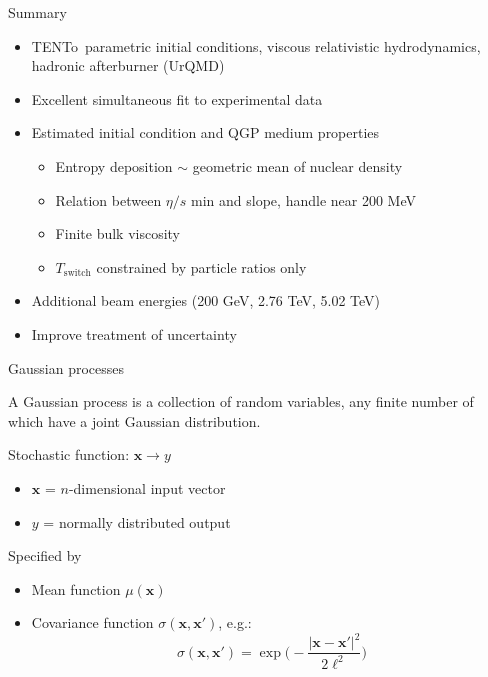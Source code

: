 \documentclass{beamer}
\newcommand{\trento}{T\raisebox{-.5ex}{R}ENTo}
\newcommand{\x}{\mathbf x}
\begin{document}
\begin{frame}{Summary}
  \begin{itemize}
    \item \trento\ parametric initial conditions, viscous relativistic hydrodynamics, hadronic afterburner (UrQMD)
      \smallskip
    \item Excellent simultaneous fit to experimental data
      \smallskip
    \item Estimated initial condition and QGP medium properties
      \begin{itemize}
        \item Entropy deposition $\sim$ geometric mean of nuclear density
        \item Relation between $\eta/s$ min and slope, handle near 200 MeV
        \item Finite bulk viscosity
        \item $T_\text{switch}$ constrained by particle ratios only
      \end{itemize}
      \bigskip
    \item Additional beam energies (200 GeV, 2.76 TeV, 5.02 TeV)
    \item Improve treatment of uncertainty
  \end{itemize}
\end{frame}


\appendix


\begin{frame}{Gaussian processes}
  \begin{definition}
    A Gaussian process is a collection of random variables, any finite number of which have a joint Gaussian distribution.
  \end{definition}
  \medskip
  Stochastic function: $\x \rightarrow y$ \\
  \begin{itemize}
    \item $\x$ = $n$-dimensional input vector
    \item $y$ = normally distributed output
  \end{itemize}
  Specified by
  \begin{itemize}
    \item Mean function $\mu(\x)$
    \item Covariance function $\sigma(\x, \x')$, e.g.:
      \begin{equation*}
        \sigma(\x, \x') = \exp\biggl( -\frac{|\x - \x'|^2}{2\ell^2} \biggr)
      \end{equation*}
  \end{itemize}
\end{frame}
\end{document}
